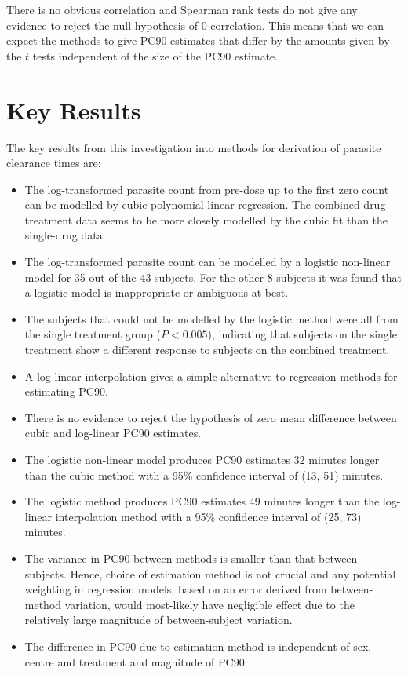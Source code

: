 There is no obvious correlation and Spearman rank tests do not give any evidence to reject the null hypothesis of 0 correlation. This means that we can expect the methods to give PC90 estimates that differ by the amounts given by the $t$ tests independent of the size of the PC90 estimate.
\section{Key Results}
The key results from this investigation into methods for derivation of parasite clearance times are:
\begin{itemize}
\item The log-transformed parasite count from pre-dose up to the first zero count can be modelled by cubic polynomial linear regression. The combined-drug treatment data seems to be more closely modelled by the cubic fit than the single-drug data.
\item The log-transformed parasite count can be modelled by a logistic non-linear model for 35 out of the 43 subjects. For the other 8 subjects it was found that a logistic model is inappropriate or ambiguous at best.
\item The subjects that could not be modelled by the logistic method were all from the single treatment group ($P<0.005$), indicating that subjects on the single treatment show a different response to subjects on the combined treatment.
\item A log-linear interpolation gives a simple alternative to regression methods for estimating PC90.
\item There is no evidence to reject the hypothesis of zero mean difference between cubic and log-linear PC90 estimates.
\item The logistic non-linear model produces PC90 estimates 32 minutes longer than the cubic method 
with a 95\% confidence interval of (13, 51) minutes.
\item The logistic method produces PC90 estimates 49 minutes longer than the log-linear interpolation method with a 95\% confidence interval of (25, 73) minutes.
\item The variance in PC90 between methods is smaller than that between subjects. Hence, choice of estimation method is not crucial and any potential weighting in regression models, based on an error derived from between-method variation, would most-likely have negligible effect due to the relatively large magnitude of between-subject variation.
\item The difference in PC90 due to estimation method is independent of sex, centre and treatment and magnitude of PC90. 
\end{itemize}

